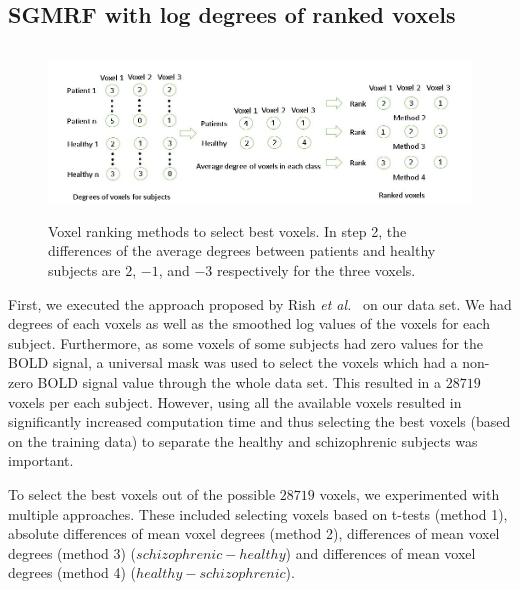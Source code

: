 \documentclass{article} %
\begin{document}
\subsection{SGMRF with log degrees of ranked voxels}
\begin{figure}
\includegraphics[width=\textwidth, height=4.5cm]{diagrams/Voxel_ranking.jpg}
\caption{Voxel ranking methods to select best voxels. In step 2, the differences of the average degrees between patients and healthy subjects are $2$, $-1$, and $-3$ respectively for the three voxels.}
\label{fig:voxel_rank_img}
\end{figure}
First, we executed the approach proposed by Rish \emph{et al.}~\cite{Rish_2013} 
on our data set. We had degrees of each voxels as well 
as the smoothed log values of the voxels for each subject. Furthermore, as 
some voxels of some subjects had zero values for the BOLD signal, a universal 
mask was used to select the voxels which had a non-zero BOLD signal value 
through the whole data set. This resulted in a $28719$ voxels per each subject. 
However, using all the available voxels resulted in significantly increased 
computation time
and thus selecting the best voxels (based on the training data) to separate 
the healthy and schizophrenic subjects was important. 

To select the best voxels out of the possible $28719$ voxels, we experimented
with multiple approaches. These included selecting voxels based on t-tests (method 1), 
absolute differences of mean voxel degrees (method 2),
differences of mean voxel degrees (method 3) ($schizophrenic - healthy$) and
differences of mean voxel degrees (method 4) ($healthy - schizophrenic$).
\end{document}
